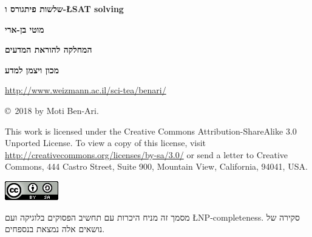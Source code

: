\documentclass[12pt,a4paper]{article}
\begin{document}
\thispagestyle{empty}


\begin{center}
\textbf{\Huge שלשות פיתגורס ו-\L{SAT solving}}

\bigskip
\bigskip

\textbf{\Large מוטי בן-ארי}

\bigskip

\textbf{\Large המחלקה להוראת המדעים}

\bigskip

\textbf{\Large מכון ויצמן למדע}

\bigskip

\url{http://www.weizmann.ac.il/sci-tea/benari/}

\bigskip

\end{center}


\begin{center}
\copyright{}\  2018 by Moti Ben-Ari.
\end{center}

\begin{footnotesize}
This work is licensed under the Creative Commons Attribution-ShareAlike 3.0 Unported License. To view a copy of this license, visit \url{http://creativecommons.org/licenses/by-sa/3.0/} or send a letter to Creative Commons, 444 Castro Street, Suite 900, Mountain View, California, 94041, USA.
\end{footnotesize}

\bigskip

\begin{center}
\includegraphics[width=.2\textwidth]{../by-sa.png}
\end{center}

\bigskip

\newpage


מסמך זה מניח היכרות עם תחשיב הפסוקים בלוגיקה ועם
\L{NP-completeness}.
סקירה של נושאים אלה נמצאת בנספחים.

\section{}
\end{document}
